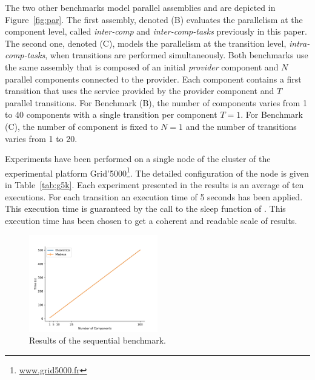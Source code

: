 The two other benchmarks model \mad parallel assemblies and are
depicted in Figure~\ref{fig:par}. The first assembly, denoted (B)
evaluates the parallelism at the component level, called
\emph{inter-comp} and \emph{inter-comp-tasks} previously in this
paper. The second one, denoted (C), models the parallelism at the
transition level, \ie \emph{intra-comp-tasks}, when transitions are
performed simultaneously.
%
Both benchmarks use the same assembly that is composed of an initial
\emph{provider} component and $N$ parallel components connected to the
provider. Each component contains a first transition that uses the
service provided by the provider component and $T$ parallel
transitions. For Benchmark (B), the number of components varies from 1
to 40 components with a single transition per component $T=1$. For
Benchmark (C), the number of component is fixed to $N=1$ and the
number of transitions varies from 1 to 20.

Experiments have been performed on a single node of the \ecotype
cluster of the experimental platform
Grid'5000\footnote{\url{www.grid5000.fr}}. The detailed configuration
of the node is given in Table~\ref{tab:g5k}. Each experiment presented
in the results is an average of ten executions. For each transition
an execution time of 5 seconds has been applied. This execution time
is guaranteed by the call to the sleep function of \python. This
execution time has been chosen to get a coherent and readable scale of
results.

\begin{figure}[h]
  \begin{center} 
    \includegraphics[width=0.5\textwidth]{./images/evaluations_sequential.pdf}
    \caption{Results of the sequential benchmark.}
    \label{fig:seqres}
  \end{center}
\end{figure}

